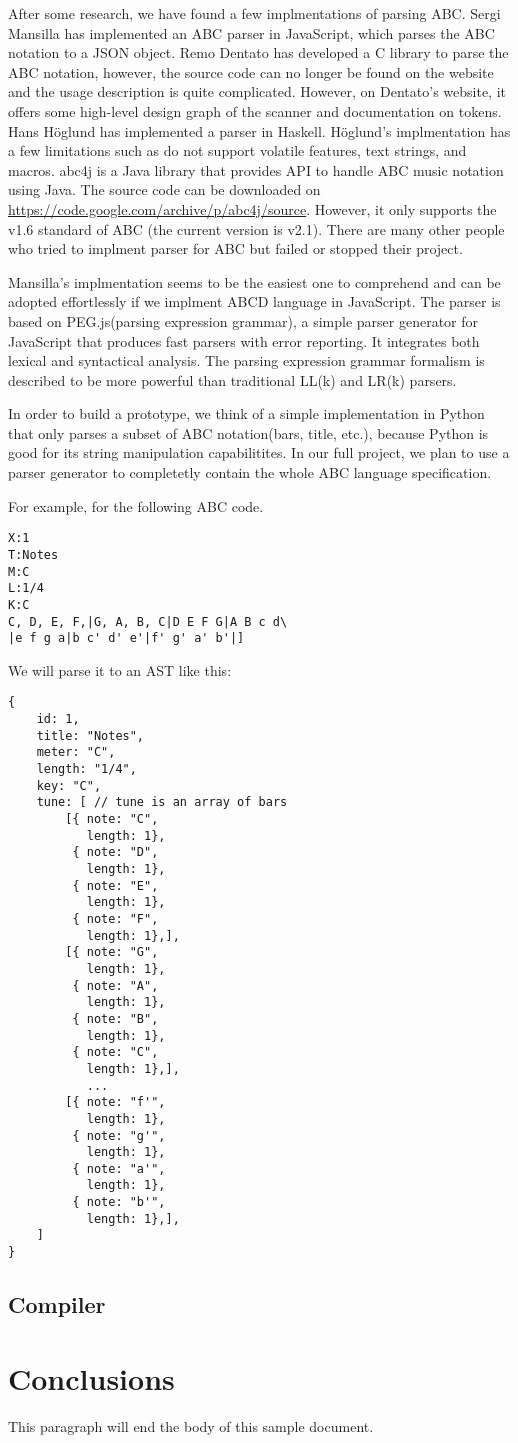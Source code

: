 After some research, we have found a few implmentations of parsing ABC. Sergi Mansilla has implemented an ABC parser in JavaScript, which parses the ABC notation to a JSON object\cite{Mansilla12}. Remo Dentato has developed a C library to parse the ABC notation\cite{Dentato09}, however, the source code can no longer be found on the website and the usage description is quite complicated. However, on Dentato's website, it offers some high-level design graph of the scanner and documentation on tokens. Hans H\"{o}glund has implemented a parser in Haskell\cite{Hoglund15}. H\"{o}glund's implmentation has a few limitations such as do not support volatile features, text strings, and macros. abc4j is a Java library that provides API to handle ABC music notation using Java. The source code can be downloaded on \url{https://code.google.com/archive/p/abc4j/source}. However, it only supports the v1.6 standard of ABC (the current version is v2.1). There are many other people who tried to implment parser for ABC but failed or stopped their project.

Mansilla's implmentation seems to be the easiest one to comprehend and can be adopted effortlessly if we implment ABCD language in JavaScript. The parser is based on PEG.js(parsing expression grammar), a simple parser generator for JavaScript that produces fast parsers with error reporting\cite{Ryuu17}. It integrates both lexical and syntactical analysis. The parsing expression grammar formalism is described to be more powerful than traditional LL(k) and LR(k) parsers.

In order to build a prototype, we think of a simple implementation in Python that only parses a subset of ABC notation(bars, title, etc.), because Python is good for its string manipulation capabilitites. In our full project, we plan to use a parser generator to completetly contain the whole ABC language specification. 

For example, for the following ABC code.
\begin{verbatim}
X:1
T:Notes
M:C
L:1/4
K:C
C, D, E, F,|G, A, B, C|D E F G|A B c d\
|e f g a|b c' d' e'|f' g' a' b'|]
\end{verbatim}

We will parse it to an AST like this:
\begin{verbatim}
{
	id: 1,
	title: "Notes",
	meter: "C",
	length: "1/4",
	key: "C",
	tune: [ // tune is an array of bars
	    [{ note: "C",
	       length: 1},
	     { note: "D",
	       length: 1},
	     { note: "E",
	       length: 1},
	     { note: "F",
	       length: 1},],
	    [{ note: "G",
	       length: 1},
	     { note: "A",
	       length: 1},
	     { note: "B",
	       length: 1},
	     { note: "C",
	       length: 1},],
	       ...
	    [{ note: "f'",
	       length: 1},
	     { note: "g'",
	       length: 1},
	     { note: "a'",
	       length: 1},
	     { note: "b'",
	       length: 1},],
	]
}
\end{verbatim}

\subsection{Compiler}

\section{Conclusions}

This paragraph will end the body of this sample document.